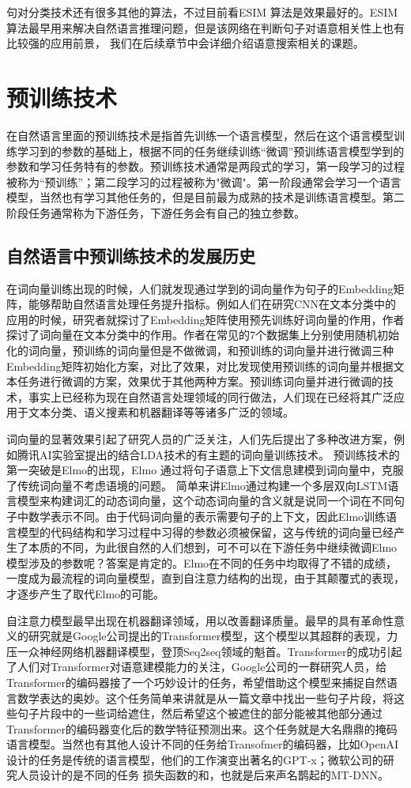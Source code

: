 \documentclass[twoside,a4paper,12pt]{book}%
\begin{document}
句对分类技术还有很多其他的算法，不过目前看ESIM 算法是效果最好的。ESIM 算法最早用来解决自然语言推理问题，但是该网络在判断句子对语意相关性上也有比较强的应用前景， 我们在后续章节中会详细介绍语意搜索相关的课题。

\chapter{预训练技术}
在自然语言里面的预训练技术是指首先训练一个语言模型，然后在这个语言模型训练学习到的参数的基础上，根据不同的任务继续训练“微调”预训练语言模型学到的参数和学习任务特有的参数。预训练技术通常是两段式的学习，第一段学习的过程被称为“预训练”；第二段学习的过程被称为"微调"。第一阶段通常会学习一个语言模型，当然也有学习其他任务的，但是目前最为成熟的技术是训练语言模型。第二阶段任务通常称为下游任务，下游任务会有自己的独立参数。
\section{自然语言中预训练技术的发展历史}
在词向量训练出现的时候，人们就发现通过学到的词向量作为句子的Embedding矩阵，能够帮助自然语言处理任务提升指标。例如人们在研究\gls{CNN}在文本分类中的应用的时候，研究者就探讨了Embedding矩阵使用预先训练好词向量的作用，作者探讨了词向量在文本分类中的作用。作者在常见的7个数据集上分别使用随机初始化的词向量，预训练的词向量但是不做微调，和预训练的词向量并进行微调三种Embedding矩阵初始化方案，对比了效果，对比发现使用预训练的词向量并根据文本任务进行微调的方案，效果优于其他两种方案。预训练词向量并进行微调的技术，事实上已经称为现在自然语言处理领域的同行做法，人们现在已经将其广泛应用于文本分类、语义搜素和机器翻译等等诸多广泛的领域。

词向量的显著效果引起了研究人员的广泛关注，人们先后提出了多种改进方案，例如腾讯AI实验室提出的结合\gls{LDA}技术的有主题的词向量训练技术。
预训练技术的第一突破是Elmo的出现，Elmo 通过将句子语意上下文信息建模到词向量中，克服了传统词向量不考虑语境的问题。 简单来讲Elmo通过构建一个多层双向\gls{LSTM}语言模型来构建词汇的动态词向量，这个动态词向量的含义就是说同一个词在不同句子中数学表示不同。由于代码词向量的表示需要句子的上下文，因此Elmo训练语言模型的代码结构和学习过程中习得的参数必须被保留，这与传统的词向量已经产生了本质的不同，为此很自然的人们想到，可不可以在下游任务中继续微调Elmo模型涉及的参数呢？答案是肯定的。Elmo在不同的任务中均取得了不错的成绩，一度成为最流程的词向量模型，直到自注意力结构的出现，由于其颠覆式的表现，才逐步产生了取代Elmo的可能。

自注意力模型最早出现在机器翻译领域，用以改善翻译质量。最早的具有革命性意义的研究就是Google公司提出的Transformer模型，这个模型以其超群的表现，力压一众神经网络机器翻译模型，登顶Seq2seq领域的魁首。Transformer的成功引起了人们对Transformer对语意建模能力的关注，Google公司的一群研究人员，给Transformer的编码器接了一个巧妙设计的任务，希望借助这个模型来捕捉自然语言数学表达的奥妙。这个任务简单来讲就是从一篇文章中找出一些句子片段，将这些句子片段中的一些词给遮住，然后希望这个被遮住的部分能被其他部分通过Transformer的编码器变化后的数学特征预测出来。这个任务就是大名鼎鼎的掩码语言模型。当然也有其他人设计不同的任务给Transofmer的编码器，比如OpenAI设计的任务是传统的语言模型，他们的工作演变出著名的\gls{GPT}-x；微软公司的研究人员设计的是不同的任务
损失函数的和，也就是后来声名鹊起的MT-DNN。
\end{document}
